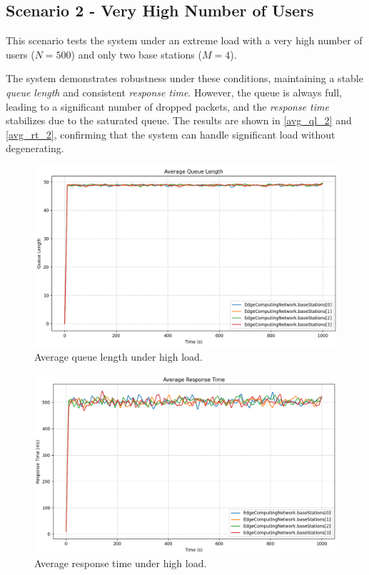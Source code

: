 \documentclass{report}
\begin{document}
\subsection{Scenario 2 - Very High Number of Users}
This scenario tests the system under an extreme load with a very high number of users ($N = 500$) and only two base stations ($M = 4$). 

\begin{flushleft}
The system demonstrates robustness under these conditions, maintaining a stable \textit{queue length} and consistent \textit{response time}. However, the queue is always full, leading to a significant number of dropped packets, and the \textit{response time} stabilizes due to the saturated queue. The results are shown in \autoref{avg_ql_2} and \autoref{avg_rt_2}, confirming that the system can handle significant load without degenerating.
\end{flushleft}

\begin{figure}[H]
    \centering
    \includegraphics[width=1\textwidth]{img/avg_ql_2.png}
    \caption{Average queue length under high load.}
    \label{avg_ql_2}
\end{figure}

\begin{figure}[H]
    \centering
    \includegraphics[width=1\textwidth]{img/avg_rt_2.png}
    \caption{Average response time under high load.}
    \label{avg_rt_2}
\end{figure}
\end{document}

